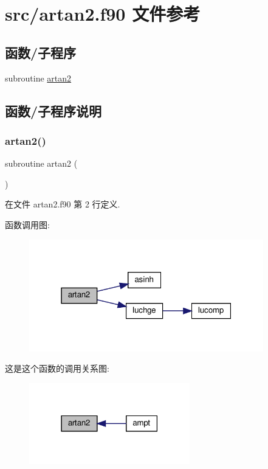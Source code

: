 \hypertarget{artan2_8f90}{}\section{src/artan2.f90 文件参考}
\label{artan2_8f90}
\subsection*{函数/子程序}
\begin{DoxyCompactItemize}
\item 
subroutine \mbox{\hyperlink{artan2_8f90_a90c8937df9b513a843aac2af40e1d1f2}{artan2}}
\end{DoxyCompactItemize}


\subsection{函数/子程序说明}
\mbox{\label{artan2_8f90_a90c8937df9b513a843aac2af40e1d1f2}} 
\subsubsection{\texorpdfstring{artan2()}{artan2()}}
{\footnotesize\ttfamily subroutine artan2 (\begin{DoxyParamCaption}{ }\end{DoxyParamCaption})}



在文件 artan2.\+f90 第 2 行定义.

函数调用图\+:
\nopagebreak
\begin{figure}[H]
\begin{center}
\leavevmode
\includegraphics[width=289pt]{artan2_8f90_a90c8937df9b513a843aac2af40e1d1f2_cgraph}
\end{center}
\end{figure}
这是这个函数的调用关系图\+:
\nopagebreak
\begin{figure}[H]
\begin{center}
\leavevmode
\includegraphics[width=198pt]{artan2_8f90_a90c8937df9b513a843aac2af40e1d1f2_icgraph}
\end{center}
\end{figure}
